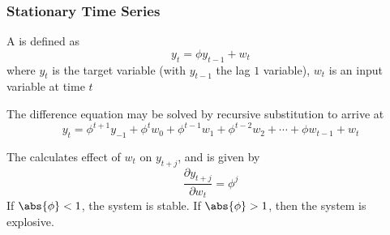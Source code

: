 \subsubsection{Stationary Time Series}

\begin{definition}
A  is defined as
\begin{equation*}
y_t = \phi y_{t-1} + w_t \nonumber
\end{equation*}
where $y_t$ is the target variable (with $y_{t-1}$ the lag $1$ variable), $w_t$ is an input variable at time $t$
\end{definition}

The difference equation may be solved by recursive substitution to arrive at
\begin{equation*}
y_t = \phi^{t+1}y_{-1} + \phi^{t} w_0 + \phi^{t-1} w_1 + \phi^{t-2} w_2 + \cdots + \phi w_{t-1} + w_t \nonumber
\end{equation*}

The  calculates effect of $w_t$ on $y_{t+j}$, and is given by
\begin{equation*}
\frac{\partial y_{t+j}}{\partial w_t} = \phi^j \nonumber
\end{equation*}
If $\abs{\phi} < 1$, the system is stable. If $\abs{\phi} > 1$, then the system is explosive.

